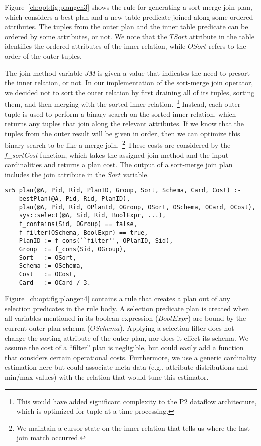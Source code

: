 Figure~\ref{ch:opt:fig:plangen3} shows the rule for generating a sort-merge
join plan, which considers a best plan and a new table predicate joined along
some ordered attributes.  The tuples from the outer plan and the inner table
predicate can be ordered by some attributes, or not.  We note that the $TSort$
attribute in the  table identifies the ordered attributes of the
inner relation, while $OSort$ refers to the order of the outer tuples.  

The join method variable $JM$ is given a value that indicates the need to
presort the inner relation, or not.  In our implementation of the sort-merge
join operator, we decided not to sort the outer relation by first draining all
of its tuples, sorting them, and then merging with the sorted inner
relation.~\footnote{This would have added significant complexity to the P2
dataflow architecture, which is optimized for tuple at a time processing.}
Instead, each outer tuple is used to perform a binary search on the sorted
inner relation, which returns any tuples that join along the relevant
attributes.  If we know that the tuples from the outer result will be given in
order, then we can optimize this binary search to be like a
merge-join.~\footnote{We maintain a cursor state on the inner relation that
tells us where the last join match occurred.} These costs are considered by the
{\em f\_sortCost} function, which takes the assigned join method and the input
cardinalities and returns a plan cost.  The output of a sort-merge join plan
includes the join attribute in the $Sort$ variable.

\begin{figure*}
\ssp
\centering
\begin{lstlisting}
sr5 plan(@A, Pid, Rid, PlanID, Group, Sort, Schema, Card, Cost) :-
    bestPlan(@A, Pid, Rid, PlanID),
    plan(@A, Pid, Rid, OPlanId, OGroup, OSort, OSchema, OCard, OCost),
    sys::select(@A, Sid, Rid, BoolExpr, ...),
    f_contains(Sid, OGroup) == false,
    f_filter(OSchema, BoolExpr) == true,
    PlanID := f_cons(``filter'', OPlanID, Sid),
    Group  := f_cons(Sid, OGroup),
    Sort   := OSort,
    Schema := OSchema,
    Cost   := OCost,
    Card   := OCard / 3.
\end{lstlisting}
\caption{\label{ch:opt:fig:plangen4}selection predicate filter plan.}
\end{figure*}

Figure~\ref{ch:opt:fig:plangen4} contains a rule that creates a plan out of any
selection predicates in the rule body.  A selection predicate plan is created
when all variables mentioned in its boolean expression ($BoolExpr$) are bound
by the current outer plan schema ($OSchema$).  Applying a selection filter does
not change the sorting attribute of the outer plan, nor does it effect its
schema.  We assume the cost of a ``filter'' plan is negligible, but could
easily add a function that considers certain operational costs.  Furthermore,
we use a generic cardinality estimation here but could associate meta-data
(e.g., attribute distributions and min/max values) with the  relation
that would tune this estimator.

